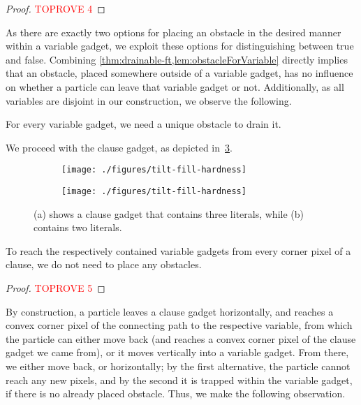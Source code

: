 \documentclass[a4paper,UKenglish,cleveref,thm-restate]{lipics-v2021}
\begin{document}
\begin{proof}\textcolor{red}{TOPROVE 4}\end{proof}

As there are exactly two options for placing an obstacle in the desired manner within a variable gadget, we exploit these options for distinguishing between true and false.
Combining \cref{thm:drainable-ft,lem:obstacleForVariable} directly implies that an obstacle, placed somewhere outside of a variable gadget, has no influence on whether a particle can leave that variable gadget or not.
Additionally, as all variables are disjoint in our construction, we observe the following.

\begin{corollary}
	\label{lem:variablesDisjoint}
	For every variable gadget, we need a unique obstacle to drain it.
\end{corollary}

We proceed with the clause gadget, as depicted in~\cref{fig:hardness-clauses}.

\begin{figure}[htb]
	\captionsetup[subfigure]{justification=centering}
	\begin{subfigure}[b]{.5\columnwidth}\centering
		\texttt{[image: ./figures/tilt-fill-hardness]}
		\caption{}
		\label{fig:hardness-clauses_a}
	\end{subfigure}\begin{subfigure}[b]{.5\columnwidth}
		\centering
		\texttt{[image: ./figures/tilt-fill-hardness]}
		\caption{}
		\label{fig:hardness-clauses_b}
	\end{subfigure}\caption{(a) shows a clause gadget that contains three literals, while (b) contains two literals.}
	\label{fig:hardness-clauses}
\end{figure}

\begin{lemma}
	\label{lem:clauseCorner}
	To reach the respectively contained variable gadgets from every corner pixel of a clause, we do not need to place any obstacles.
\end{lemma}

\begin{proof}\textcolor{red}{TOPROVE 5}\end{proof}

By construction, a particle leaves a clause gadget horizontally, and reaches a convex corner pixel of the connecting path to the respective variable, from which the particle can either move back (and reaches a convex corner pixel of the clause gadget we came from), or it moves vertically into a variable gadget.
From there, we either move back, or horizontally; by the first alternative, the particle cannot reach any new pixels, and by the second it is trapped within the variable gadget, if there is no already placed obstacle.
Thus, we make the following observation.
\end{document}
